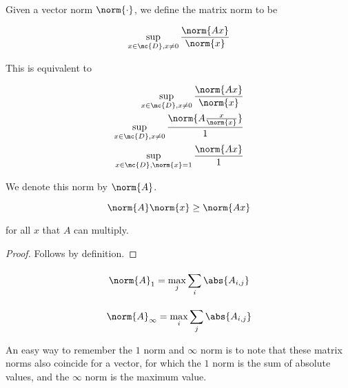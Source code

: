 \documentclass[../main.tex]{subfiles}
\begin{document}
\begin{definition}
    Given a vector norm $\norm{\cdot}$, we define the matrix norm to be

    \[
        \sup_{x \in \mc{D}, x \not = 0} \frac{\norm{Ax}}{\norm{x}}
    \]

    This is equivalent to

    \begin{align*}
        \sup_{x \in \mc{D}, x \not = 0} \frac{\norm{Ax}}{\norm{x}} \\
        \sup_{x \in \mc{D}, x \not = 0} \frac{\norm{A\frac{x}{\norm{x}}}}{1} \\
        \sup_{x \in \mc{D}, \norm{x} = 1} \frac{\norm{Ax}}{1} \\
    \end{align*}

    We denote this norm by $\norm{A}$.
\end{definition}

\begin{proposition}
    \[
        \norm{A} \norm{x} \geq \norm{Ax}
    \]

    for all $x$ that $A$ can multiply.
\end{proposition}

\begin{proof}
   Follows by definition. 
\end{proof}

\begin{proposition}
   \[
       \norm{A}_1 = \max_{j} \sum_{i}^{}\abs{A_{i,j}}
   \]

   \[
       \norm{A}_{\infty} = \max_{i} \sum_{j}^{}\abs{A_{i,j}}
   \]

   An easy way to remember the $1$ norm and $\infty$ norm is to note that these matrix norms also
   coincide for a vector, for which the $1$ norm is the sum of absolute values, and the $\infty$ norm is the maximum value.
\end{proposition}
\end{document}
